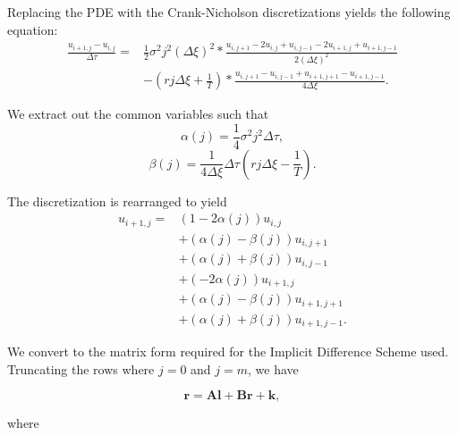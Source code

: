 \documentclass{article}
\begin{document}
Replacing the PDE with the Crank-Nicholson discretizations yields the following equation:
\begin{equation}
  \begin{split}
    \frac{u_{i+1, j} - u_{i, j}}{\Delta\tau} = & \frac{1}{2}\sigma^2j^2(\Delta\xi)^2 * \frac{u_{i, j+1} - 2u_{i, j} + u_{i, j-1} -2u_{i+1, j} + u_{i+1, j-1}}{2(\Delta\xi)^2} \\ & - (rj\Delta\xi + \frac{1}{T}) * \frac{u_{i, j+1} - u_{i,j-1} +u_{i+1, j+1} - u_{i+1, j-1}}{4\Delta\xi}.
  \end{split}
\end{equation}

We extract out the common variables such that
\begin{equation}
  \alpha(j) = \frac{1}{4}\sigma^2j^2\Delta\tau,
\end{equation}
\begin{equation}
  \beta(j) = \frac{1}{4\Delta\xi}\Delta\tau(rj\Delta\xi - \frac{1}{T}).
\end{equation}

The discretization is rearranged to yield
\begin{equation}
  \begin{split}
    u_{i+1, j} = & (1-2\alpha(j))u_{i, j} \\
    & + (\alpha(j)-\beta(j))u_{i, j+1}\\
    & + (\alpha(j)+\beta(j))u_{i, j-1}\\
    & + (-2\alpha(j))u_{i+1, j}\\
    & + (\alpha(j)-\beta(j))u_{i+1, j+1}\\
    & + (\alpha(j)+\beta(j))u_{i+1, j-1}.
  \end{split}
\end{equation}

We convert to the matrix form required for the Implicit Difference Scheme used. Truncating the rows where \(j=0\) and \(j=m\), we have

\begin{equation}
  \textbf{r} = \textbf{Al} + \textbf{Br} + \textbf{k},
\end{equation}

where
\end{document}
